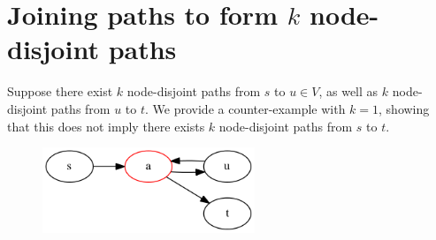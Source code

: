 \begin{figure}[ht]
  \center
\end{figure}

\section{Joining paths to form $k$ \textbf{node}-disjoint paths}
Suppose there exist $k$ node-disjoint paths from $s$ to $u \in V$, as well as $k$ node-disjoint paths from $u$ to $t$. We provide a counter-example with $k = 1$, showing that this does not imply there exists $k$ node-disjoint paths from $s$ to $t$.

\begin{figure}[ht]
  \center
  \includegraphics[width=2.5in]{figures/3-4-graph.png}
\end{figure}
